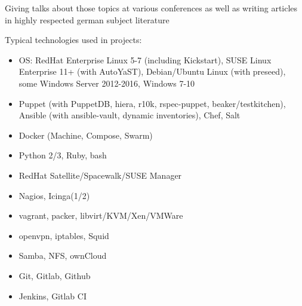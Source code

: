 \begin{cventries}
{\begin{cvitems}
        \item Giving talks about those topics at various conferences as well as writing articles in highly respected german subject literature
        \item Typical technologies used in projects:
          \begin{itemize}
            \item OS: RedHat Enterprise Linux 5-7 (including Kickstart), SUSE Linux Enterprise 11+ (with AutoYaST), Debian/Ubuntu Linux (with preseed), some Windows Server 2012-2016, Windows 7-10
            \item Puppet (with PuppetDB, hiera, r10k, rspec-puppet, beaker/testkitchen), Ansible (with ansible-vault, dynamic inventories), Chef, Salt
            \item Docker (Machine, Compose, Swarm)
            \item Python 2/3, Ruby, bash
            \item RedHat Satellite/Spacewalk/SUSE Manager
            \item Nagios, Icinga(1/2)
            \item vagrant, packer, libvirt/KVM/Xen/VMWare
            \item openvpn, iptables, Squid
            \item Samba, NFS, ownCloud
            \item Git, Gitlab, Github
            \item Jenkins, Gitlab CI
          \end{itemize}
      \end{cvitems}
    }


\end{cventries}
